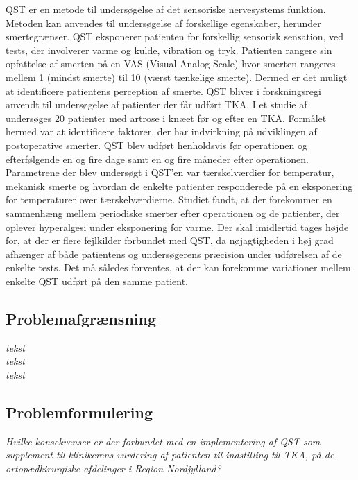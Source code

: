 QST er en metode til undersøgelse af det sensoriske nervesystems funktion. Metoden kan anvendes til undersøgelse af forskellige egenskaber, herunder smertegrænser. QST eksponerer patienten for forskellig sensorisk sensation, ved tests, der involverer varme og kulde, vibration og tryk. Patienten rangere sin opfattelse af smerten på en VAS (Visual Analog Scale) hvor smerten rangeres mellem 1 (mindst smerte) til 10 (værst tænkelige smerte). Dermed er det muligt at identificere patientens perception af smerte.
QST bliver i forskningsregi anvendt til undersøgelse af patienter der får udført TKA. I et studie af \citep{Martinez2007} undersøges 20 patienter med artrose i knæet før og efter en TKA. Formålet hermed var at identificere faktorer, der har indvirkning på udviklingen af postoperative smerter. QST blev udført henholdsvis før operationen og efterfølgende en og fire dage samt en og fire måneder efter operationen. Parametrene der blev undersøgt i QST'en var tærskelværdier for temperatur, mekanisk smerte og hvordan de enkelte patienter responderede på en eksponering for temperaturer over tærskelværdierne. Studiet fandt, at der forekommer en sammenhæng mellem periodiske smerter efter operationen og de patienter, der oplever hyperalgesi under eksponering for varme. \citep{Martinez2007} Der skal imidlertid tages højde for, at der er flere fejlkilder forbundet med QST, da nøjagtigheden i høj grad afhænger af både patientens og undersøgerens præcision under udførelsen af de enkelte tests. Det må således forventes, at der kan forekomme variationer mellem enkelte QST udført på den samme patient. \citep{Yarnitsky2006}


\subsection{Problemafgrænsning}

\textit{tekst} \\
\textit{tekst} \\
\textit{tekst} \\

\subsection*{Problemformulering}

\begin{center}
	\textit{Hvilke konsekvenser er der forbundet med en implementering af QST som supplement til klinikerens vurdering af patienten til indstilling til TKA, på de ortopædkirurgiske afdelinger i Region Nordjylland?}
\end{center}











